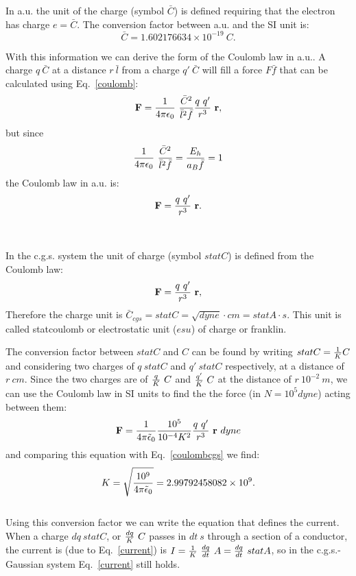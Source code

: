 \documentclass[12pt,a4paper]{article}
\def\barc{1.602176634\times 10^{-19}}
\def\kappa{2.99792458082\times 10^{9}}
\begin{document}
{\color{web-blue} In a.u. the unit of the charge (symbol $\bar C$) is
defined requiring that the electron has charge $e=\bar C$. The conversion 
factor between a.u. and the SI unit is: 
\begin{equation}
\bar C=\barc\ C.
\end{equation}

With this information we can derive the form of the Coulomb law in a.u..
A charge $q\ \bar C$ at a distance $r\ \bar l$ from a
charge $q'\ \bar C$ will fill a force $F \bar f$ that can be 
calculated using Eq.~\ref{coulomb}:
\begin{equation}
{\bf F} = {1\over 4 \pi \epsilon_0}\ {\bar C^2 \over \bar l^2 \bar f} 
{q\ q' \over r^3}\ {\bf r},
\end{equation}
but since
\begin{equation}
{1\over 4 \pi \epsilon_0}\ {\bar C^2 \over \bar l^2\bar f} = 
{E_h \over a_B \bar f}=1
\end{equation}
the Coulomb law in a.u. is:
\begin{equation}
{\bf F} = {q\ q' \over r^3}\ {\bf r}. 
\end{equation}
}
\\

{\color{orange} In the c.g.s. system the unit of charge (symbol $statC$)
is defined from the Coulomb law:
\begin{equation}
{\bf F} = {q\ q'\over r^3}\ {\bf r},
\label{coulombcgs}
\end{equation}
Therefore the charge unit is $\bar C_{cgs}=statC=\sqrt{dyne}\cdot cm=
statA\cdot s$. This unit is called statcoulomb 
or electrostatic unit ($esu$) of charge or franklin.

The conversion factor between $statC$ and $C$ can be found by writing
$statC={1\over K} C$ and considering two charges of $q\ statC$ and 
$q'\ statC$ respectively, at a distance of $r\ cm$. Since the two charges are
of ${q\over K}\ C$ and ${q'\over K}\ C$ at the distance of $r\ 10^{-2}\ m$,
we can use the Coulomb law in SI units to find the 
the force (in $N=10^5 dyne$) acting between them: 
\begin{equation}
{\bf F}={1\over 4 \pi \tilde \epsilon_0} {10^5\over 10^{-4} K^2} 
{q\ q'\over r^3}\ {\bf r}\ dyne
\end{equation}
and comparing this equation with Eq.~\ref{coulombcgs} we find:
\begin{equation}
K= \sqrt{10^9 \over 4 \pi \tilde \epsilon_0}= \kappa. 
\end{equation}
\\
Using this conversion factor we can write the equation that defines 
the current.  When a charge $dq\ statC$, or ${dq\over K}\ C$ passes in $dt\ s$
through a section of a conductor, the current is (due to Eq.~\ref{current})
is $I={1\over K}\ {dq\over dt}\ A= {dq\over dt}\ statA$, so in the 
c.g.s.-Gaussian system Eq.~\ref{current} still holds.   
}
\\
\end{document}
